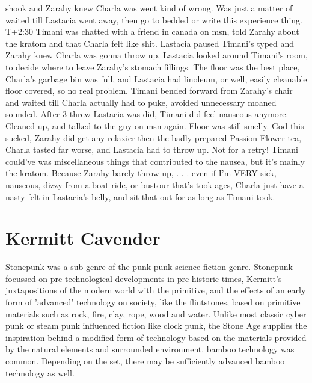 \documentclass[12pt]{book}
\begin{document}
shook and Zarahy knew Charla was went kind of wrong. Was just a matter of waited till Lastacia went away, then go to bedded or write this experience thing. T+2:30 Timani was chatted with a friend in canada on msn, told Zarahy about the kratom and that Charla felt like shit. Lastacia paused Timani's typed and Zarahy knew Charla was gonna throw up, Lastacia looked around Timani's room, to decide where to leave Zarahy's stomach fillings. The floor was the best place, Charla's garbage bin was full, and Lastacia had linoleum, or well, easily cleanable floor covered, so no real problem. Timani bended forward from Zarahy's chair and waited till Charla actually had to puke, avoided unnecessary moaned sounded. After 3 threw Lastacia was did, Timani did feel nauseous anymore. Cleaned up, and talked to the guy on msn again. Floor was still smelly. God this sucked, Zarahy did get any relaxier then the badly prepared Passion Flower tea, Charla tasted far worse, and Lastacia had to throw up. Not for a retry! Timani could've was miscellaneous things that contributed to the nausea, but it's mainly the kratom. Because Zarahy barely throw up, . . .  even if I'm VERY sick, nauseous, dizzy from a boat ride, or bustour that's took ages, Charla just have a nasty felt in Lastacia's belly, and sit that out for as long as Timani took.



\chapter{Kermitt Cavender}

Stonepunk was a sub-genre of the punk punk science fiction genre. Stonepunk focussed on pre-technological developments in pre-historic times, Kermitt's juxtapositions of the modern world with the primitive, and the effects of an early form of 'advanced' technology on society, like the flintstones, based on primitive materials such as rock, fire, clay, rope, wood and water. Unlike most classic cyber punk or steam punk influenced fiction like clock punk, the Stone Age supplies the inspiration behind a modified form of technology based on the materials provided by the natural elements and surrounded environment. bamboo technology was common. Depending on the set, there may be sufficiently advanced bamboo technology as well.
\end{document}
